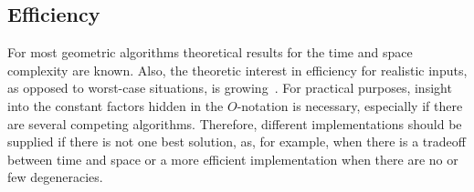 \subsection*{Efficiency}
For most geometric algorithms theoretical results for the time and space
complexity are known. Also, the theoretic interest in efficiency for
realistic inputs, as opposed to worst-case situations, is
growing~\cite{v-ffrim-97}.
For practical purposes, insight into the constant factors hidden in the
$O$-notation is necessary, especially if there are several competing
algorithms.
\ccModifierCrossRefOff
{}
\ccModifierCrossRefOn
Therefore, different implementations should be supplied if there is 
not one best solution, as, for example, when there is a tradeoff between 
time and space or a more efficient implementation when there are no or few 
degeneracies. 
